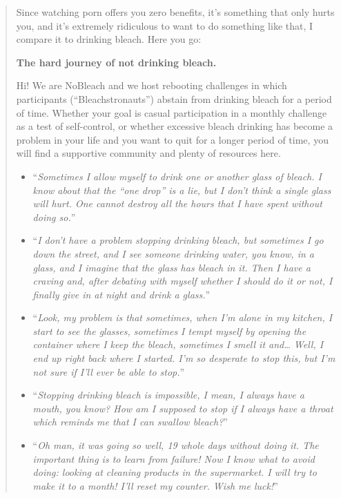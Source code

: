 \documentclass[
]{book}
\providecommand{\tightlist}{%
  \setlength{\itemsep}{0pt}\setlength{\parskip}{0pt}}
\begin{document}
\begin{quote}
Since watching porn offers you zero benefits, it's something that only hurts you, and it's extremely ridiculous to want to do something like that, I compare it to drinking bleach. Here you go:

\textbf{The hard journey of not drinking bleach.}

Hi! We are NoBleach and we host rebooting challenges in which participants (``Bleachstronauts'') abstain from drinking bleach for a period of time. Whether your goal is casual participation in a monthly challenge as a test of self-control, or whether excessive bleach drinking has become a problem in your life and you want to quit for a longer period of time, you will find a supportive community and plenty of resources here.

\begin{itemize}
\tightlist
\item
  ``\emph{Sometimes I allow myself to drink one or another glass of bleach. I know about that the ``one drop'' is a lie, but I don't think a single glass will hurt. One cannot destroy all the hours that I have spent without doing so.}''
\item
  ``\emph{I don't have a problem stopping drinking bleach, but sometimes I go down the street, and I see someone drinking water, you know, in a glass, and I imagine that the glass has bleach in it. Then I have a craving and, after debating with myself whether I should do it or not, I finally give in at night and drink a glass.}''
\item
  ``\emph{Look, my problem is that sometimes, when I'm alone in my kitchen, I start to see the glasses, sometimes I tempt myself by opening the container where I keep the bleach, sometimes I smell it and\ldots{} Well, I end up right back where I started. I'm so desperate to stop this, but I'm not sure if I'll ever be
  able to stop.}''
\item
  ``\emph{Stopping drinking bleach is impossible, I mean, I always have a mouth, you know? How am I supposed to stop if I always have a throat which reminds me that I can swallow bleach?}''
\item
  ``\emph{Oh man, it was going so well, 19 whole days without doing it. The important thing is to learn from failure! Now I know what to avoid doing: looking at cleaning products in the supermarket. I will try to make it to a month! I'll reset my counter. Wish me luck!}''
\end{itemize}
\end{quote}
\end{document}
